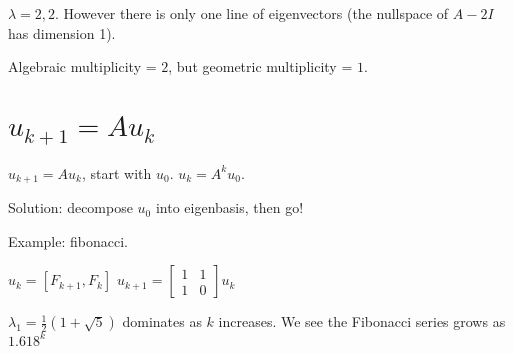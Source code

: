 \documentclass{article}
\begin{document}
$\lambda = 2,2$. However there is only one line of eigenvectors (the nullspace of $A - 2I$ has dimension 1).

Algebraic multiplicity = $2$, but geometric multiplicity = $1$.

\section{$u_{k+1} = A u_k$}

$u_{k+1} = A u_k$, start with $u_0$. $u_k = A^k u_0$.

Solution: decompose $u_0$ into eigenbasis, then go!

Example: fibonacci. 

$u_k = [F_{k+1}, F_k]$
$u_{k+1} = \begin{bmatrix}
1 & 1 \\
1 & 0
\end{bmatrix} u_k$

$\lambda_1 = \frac{1}{2} (1 + \sqrt{5})$ dominates as $k$ increases. We see the Fibonacci series grows as $1.618^ k$
\end{document}
